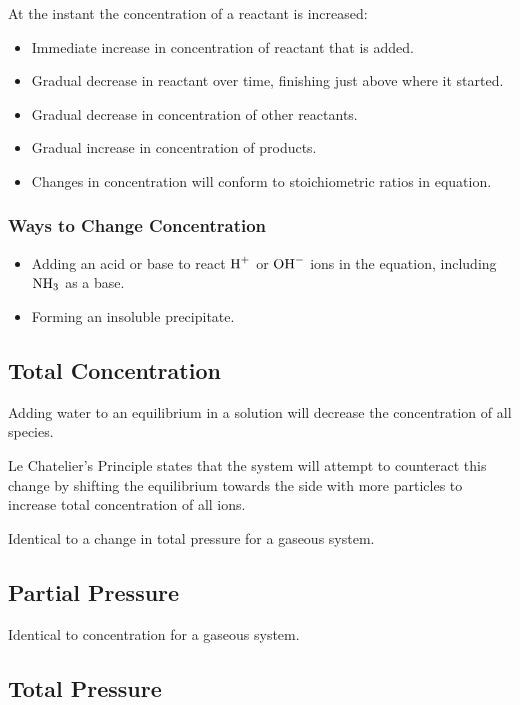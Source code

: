 \documentclass[a4paper,11pt]{article}
\begin{document}
At the instant the concentration of a reactant is increased:

\begin{itemize}
\item Immediate increase in concentration of reactant that is added.
\item Gradual decrease in reactant over time, finishing just above where it
	started.
\item Gradual decrease in concentration of other reactants.
\item Gradual increase in concentration of products.
\item Changes in concentration will conform to stoichiometric ratios in
	equation.
\end{itemize}


\subsubsection{Ways to Change Concentration}

\begin{itemize}
\item Adding an acid or base to react $\ce{H+}$ or $\ce{OH-}$ ions in the
	equation, including $\ce{NH3}$ as a base.
\item Forming an insoluble precipitate.
\end{itemize}


\subsection{Total Concentration}

Adding water to an equilibrium in a solution will decrease the concentration
of all species.

Le Chatelier's Principle states that the system will attempt to counteract this
change by shifting the equilibrium towards the side with more particles to
increase total concentration of all ions.

Identical to a change in total pressure for a gaseous system.


\subsection{Partial Pressure}

Identical to concentration for a gaseous system.


\subsection{Total Pressure}
\end{document}
